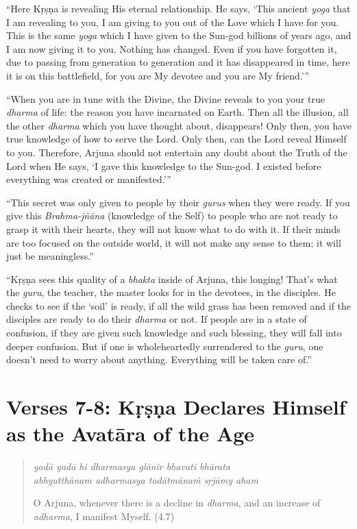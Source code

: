 \documentclass[12pt, twoside, openright]{memoir}
\begin{document}
\enquote{Here Kṛṣṇa is revealing His eternal relationship. He says, \enquote{This ancient \textit{yoga} that I am revealing to you, I am giving to you out of the Love which I have for you. This is the same \textit{yoga} which I have given to the Sun-god billions of years ago, and I am now giving it to you. Nothing has changed. Even if you have forgotten it, due to passing from generation to generation and it has disappeared in time, here it is on this battlefield, for you are My devotee and you are My friend.}}

\enquote{When you are in tune with the Divine, the Divine reveals to you your true \textit{dharma} of life: the reason you have incarnated on Earth. Then all the illusion, all the other \textit{dharma} which you have thought about, disappears! Only then, you have true knowledge of how to serve the Lord. Only then, can the Lord reveal Himself to you. Therefore, Arjuna should not entertain any doubt about the Truth of the Lord when He says, \enquote{I gave this knowledge to the Sun-god. I existed before everything was created or manifested.}}

\enquote{This secret was only given to people by their \textit{gurus} when they were ready. If you give this \textit{Brahma-jñāna} (knowledge of the Self) to people who are not ready to grasp it with their hearts, they will not know what to do with it. If their minds are too focused on the outside world, it will not make any sense to them; it will just be meaningless.}

\enquote{Kṛṣṇa sees this quality of a \textit{bhakta} inside of Arjuna, this longing! That’s what the \textit{guru}, the teacher, the master looks for in the devotees, in the disciples. He checks to see if the \enquote{soil} is ready, if all the wild grass has been removed and if the disciples are ready to do their \textit{dharma} or not. If people are in a state of confusion, if they are given such knowledge and such blessing, they will fall into deeper confusion. But if one is wholeheartedly surrendered to the \textit{guru}, one doesn’t need to worry about anything. Everything will be taken care of.}

\section{Verses 7-8: Kṛṣṇa Declares Himself as the Avatāra of the Age}\label{sec-verses-7-8-krsna-declares-himself-as-the-avatara-of-the-age}


\par
\begin{verse}
\textit{yadā yadā hi dharmasya glānir bhavati bhārata} \\
\textit{abhyutthānam adharmasya tadātmānaṁ sṛjāmy aham}

\noindent O Arjuna, whenever there is a decline in \textit{dharma}, and an increase of \textit{adharma}, I manifest Myself. (4.7)
\end{verse}
\par
\end{document}
